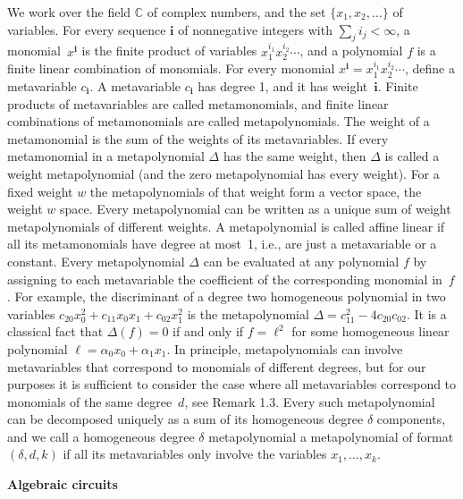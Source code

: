 \documentclass[10pt,a4paper]{article}
\begin{document}
We work over the field $\mathbb{C}$ of complex numbers, and the set $\{x_{1},x_{2},\ldots\}$ of variables.
For every sequence $\bm{i}$ of nonnegative integers with $\sum_{j}i_{j}<\infty$,
a monomial $x^{\bm{i}}$ is the finite product of variables $x_{1}^{i_{1}}x_{2}^{i_{2}}\cdots$, and a polynomial $f$ is a finite linear combination of monomials.
For every monomial $x^{\bm{i}}=x_{1}^{i_{1}}x_{2}^{i_{2}}\cdots$, define a metavariable $c_{\bm{i}}$.
A metavariable $c_{{\bm{i}}}$ has degree 1, and it has weight $\bm{i}$.
Finite products of metavariables are called metamonomials, and finite linear combinations of metamonomials are called metapolynomials.
The weight of a metamonomial is the sum of the weights of its metavariables.
If every metamonomial in a metapolynomial $\Delta$ has the same weight, then $\Delta$ is called a weight metapolynomial (and the zero metapolynomial has every weight).
For a fixed weight $w$ the metapolynomials of that weight form a vector space, the weight $w$ space.
Every metapolynomial can be written as a unique sum of weight metapolynomials of different weights.
A metapolynomial is called affine linear if all its metamonomials have degree at most 1, i.e., are just a metavariable or a constant.
Every metapolynomial $\Delta$ can be evaluated at any polynomial $f$ by assigning to each metavariable the coefficient of the corresponding monomial in $f$.
For example, the discriminant of a degree two homogeneous polynomial in two variables $c_{20}x_{0}^{2}+c_{11}x_{0}x_{1}+c_{02}x_{1}^{2}$ is the metapolynomial $\Delta=c_{11}^{2}-4c_{20}c_{02}$. It is a classical fact that $\Delta(f)=0$ if and only if $f=\ell^{2}$ for some homogeneous linear polynomial $\ell=\alpha_{0}x_{0}+\alpha_{1}x_{1}$.
In principle, metapolynomials can involve metavariables that correspond to monomials of different degrees, but for our purposes it is sufficient to consider the case where all metavariables correspond to monomials of the same degree $d$, see Remark 1.3.
Every such metapolynomial can be decomposed uniquely as a sum of its homogeneous degree $\delta$ components,
and we call a homogeneous degree $\delta$ metapolynomial a metapolynomial of format $(\delta,d,k)$ if all its metavariables only involve the variables $x_{1},\ldots,x_{k}$.






\par\medskip\noindent\textbf{Algebraic circuits}\par
\end{document}
